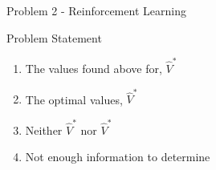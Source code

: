 \begin{problem}{Problem 2 - Reinforcement Learning}
\begin{statement}{Problem Statement}
\begin{enumerate}[label=(\alph*)]
\begin{enumerate}[label=(\roman*)]
                \begin{enumerate}[label=\(\circ\)]
                    \item The values found above for, $\hat{V}^{*}$
                    \item The optimal values, $\hat{V}^{*}$
                    \item Neither $\hat{V}^{*}$ nor $\hat{V}^{*}$
                    \item Not enough information to determine
                \end{enumerate}
            \end{enumerate}
        \end{enumerate}
    \end{statement}

    \newpage


\end{problem}
